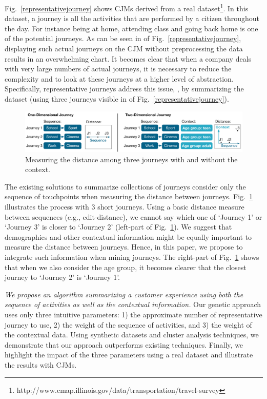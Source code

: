 \documentclass[runningheads]{llncs}
\begin{document}
Fig.~\ref{representativejourney} shows CJMs derived from a real dataset\footnote{http://www.cmap.illinois.gov/data/transportation/travel-survey
}. In this dataset, a journey is all the activities that are performed by a citizen throughout the day. For instance being at home, attending class and going back home is one of the potential journeys. As can be seen in  of Fig.~{\ref{representativejourney}}, displaying such actual journeys on the CJM without preprocessing the data results in an overwhelming chart. It becomes clear that when a company deals with very large numbers of actual journeys, it is necessary to reduce the complexity and to look at these journeys at a higher level of abstraction. Specifically, representative journeys address this issue, \cite{bernard2019genetic}, by summarizing the dataset (using three journeys visible in  of Fig.~\ref{representativejourney}). 

\begin{figure}[H]
\centering
\includegraphics[width=1\columnwidth]{05_schema/context1.pdf}
\caption{Measuring the distance among three journeys with and without the context.}
\label{context1}
\end{figure}

The existing solutions to summarize collections of journeys \cite{gabadinho2009summarizing,bernard2019genetic} consider only the sequence of touchpoints when measuring the distance between journeys. Fig.~\ref{context1} illustrates the process with 3 short journeys. Using a basic distance measure between sequences (e.g., edit-distance), we cannot say which one of `Journey 1' or `Journey 3' is closer to `Journey 2' (left-part of Fig.~\ref{context1}). We suggest that demographics and other contextual information might be equally important to measure the distance between journeys. Hence, in this paper, we propose to integrate such information when mining journeys. The right-part of Fig.~\ref{context1} shows that when we also consider the age group, it becomes clearer that the closest journey to `Journey 2' is `Journey 1'.

{\it We propose an algorithm summarizing a customer experience using both the sequence of activities as well as the contextual information.} Our genetic approach uses only three intuitive parameters: 1) the approximate number of representative journey to use, 2) the weight of the sequence of activities, and 3) the weight of the contextual data. Using synthetic datasets and cluster analysis techniques, we demonstrate that our approach outperforms existing techniques. Finally, we highlight the impact of the three parameters using a real dataset and illustrate the results with CJMs. 
\end{document}
